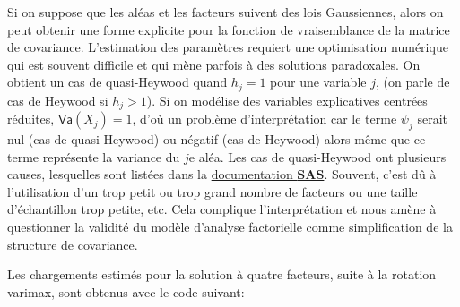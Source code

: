 \documentclass[
  11pt,
  letterpaper,
]{scrbook}
\newenvironment{Shaded}{\begin{snugshade}}{\end{snugshade}}
\newcommand{\AttributeTok}[1]{\textcolor[rgb]{0.40,0.45,0.13}{#1}}
\newcommand{\CommentTok}[1]{\textcolor[rgb]{0.37,0.37,0.37}{#1}}
\newcommand{\DecValTok}[1]{\textcolor[rgb]{0.68,0.00,0.00}{#1}}
\newcommand{\FloatTok}[1]{\textcolor[rgb]{0.68,0.00,0.00}{#1}}
\newcommand{\FunctionTok}[1]{\textcolor[rgb]{0.28,0.35,0.67}{#1}}
\newcommand{\NormalTok}[1]{\textcolor[rgb]{0.00,0.23,0.31}{#1}}
\newcommand{\OtherTok}[1]{\textcolor[rgb]{0.00,0.23,0.31}{#1}}
\newcommand{\SpecialCharTok}[1]{\textcolor[rgb]{0.37,0.37,0.37}{#1}}
\theoremstyle{definition}
\theoremstyle{remark}
\begin{document}
Si on suppose que les aléas et les facteurs suivent des lois
Gaussiennes, alors on peut obtenir une forme explicite pour la fonction
de vraisemblance de la matrice de covariance. L'estimation des
paramètres requiert une optimisation numérique qui est souvent difficile
et qui mène parfois à des solutions paradoxales. On obtient un cas de
quasi-Heywood quand \(h_j=1\) pour une variable \(j\), (on parle de cas
de Heywood si \(h_j > 1\)). Si on modélise des variables explicatives
centrées réduites, \(\mathsf{Va}(X_j)=1\), d'où un problème
d'interprétation car le terme \(\psi_j\) serait nul (cas de
quasi-Heywood) ou négatif (cas de Heywood) alors même que ce terme
représente la variance du \(j\)e aléa. Les cas de quasi-Heywood ont
plusieurs causes, lesquelles sont listées dans la
\href{https://support.sas.com/documentation/cdl/en/statug/63033/HTML/default/viewer.htm\#statug_factor_sect022.htm}{documentation
\textbf{SAS}}. Souvent, c'est dû à l'utilisation d'un trop petit ou trop
grand nombre de facteurs ou une taille d'échantillon trop petite, etc.
Cela complique l'interprétation et nous amène à questionner la validité
du modèle d'analyse factorielle comme simplification de la structure de
covariance.

Les chargements estimés pour la solution à quatre facteurs, suite à la
rotation varimax, sont obtenus avec le code suivant:

\begin{Shaded}
\end{Shaded}
\end{document}
